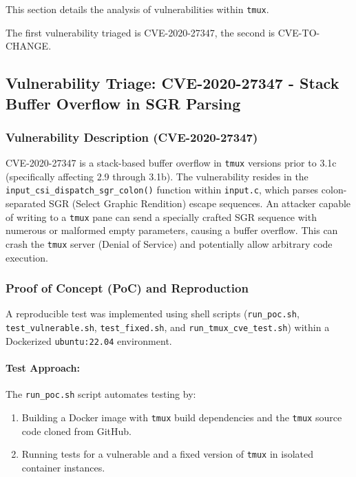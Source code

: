 This section details the analysis of vulnerabilities within \texttt{tmux}.

The first vulnerability triaged is CVE-2020-27347, the second is CVE-TO-CHANGE.

\subsection{Vulnerability Triage: CVE-2020-27347 - Stack Buffer Overflow in SGR Parsing}

\subsubsection{Vulnerability Description (CVE-2020-27347)}

CVE-2020-27347 is a stack-based buffer overflow in \texttt{tmux} versions prior to 3.1c (specifically affecting 2.9 through 3.1b). The vulnerability resides in the \texttt{input\_csi\_dispatch\_sgr\_colon()} function within \texttt{input.c}, which parses colon-separated SGR (Select Graphic Rendition) escape sequences. An attacker capable of writing to a \texttt{tmux} pane can send a specially crafted SGR sequence with numerous or malformed empty parameters, causing a buffer overflow. This can crash the \texttt{tmux} server (Denial of Service) and potentially allow arbitrary code execution.

\subsubsection{Proof of Concept (PoC) and Reproduction}

A reproducible test was implemented using shell scripts (\texttt{run\_poc.sh}, \texttt{test\_vulnerable.sh}, \texttt{test\_fixed.sh}, and \texttt{run\_tmux\_cve\_test.sh}) within a Dockerized \texttt{ubuntu:22.04} environment.

\paragraph{Test Approach:}
The \texttt{run\_poc.sh} script automates testing by:

\begin{enumerate}
	\item Building a Docker image with \texttt{tmux} build dependencies and the \texttt{tmux} source code cloned from GitHub.
	\item Running tests for a vulnerable and a fixed version of \texttt{tmux} in isolated container instances.
\end{enumerate}

